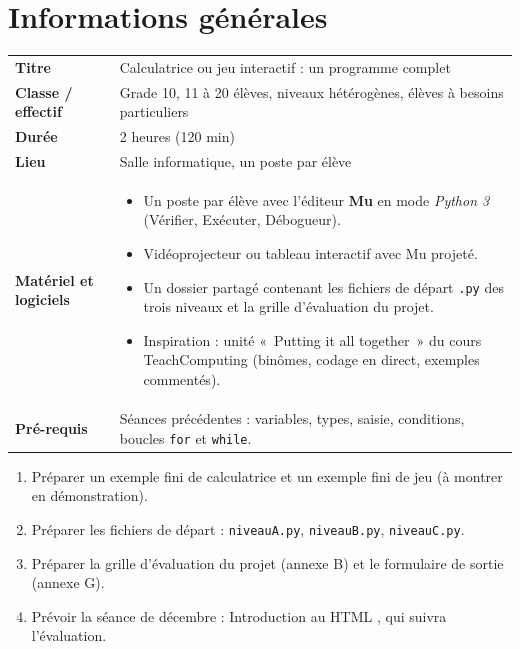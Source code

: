 \documentclass[11pt,a4paper]{article}
\begin{document}

\section{Informations générales}
\begin{tabularx}{\linewidth}{>{\bfseries}p{3.6cm}Y}
\toprule
Titre & Calculatrice ou jeu interactif : un programme complet\\
Classe / effectif & Grade 10, 11 à 20 élèves, niveaux hétérogènes, élèves à besoins particuliers\\
Durée & 2 heures (120 min)\\
Lieu & Salle informatique, un poste par élève\\
Matériel et logiciels &
\begin{itemize}
 \item Un poste par élève avec l'éditeur \textbf{Mu} en mode \emph{Python 3} (Vérifier, Exécuter, Débogueur).
 \item Vidéoprojecteur ou tableau interactif avec Mu projeté.
 \item Un dossier partagé contenant les fichiers de départ \texttt{.py} des trois niveaux et la grille d'évaluation du projet.
 \item Inspiration : unité «~Putting it all together~» du cours TeachComputing (binômes, codage en direct, exemples commentés).
\end{itemize}\\
Pré-requis &
Séances précédentes : variables, types, saisie, conditions, boucles \texttt{for} et \texttt{while}.\\
\bottomrule
\end{tabularx}

\begin{astuce}
\begin{enumerate}
 \item Préparer un exemple fini de calculatrice et un exemple fini de jeu (à montrer en démonstration).
 \item Préparer les fichiers de départ : \texttt{niveauA.py}, \texttt{niveauB.py}, \texttt{niveauC.py}.
 \item Préparer la grille d'évaluation du projet (annexe B) et le formulaire de sortie (annexe G).
 \item Prévoir la séance de décembre : \og Introduction au HTML \fg{}, qui suivra l'évaluation.
\end{enumerate}
\end{astuce}
\end{document}
